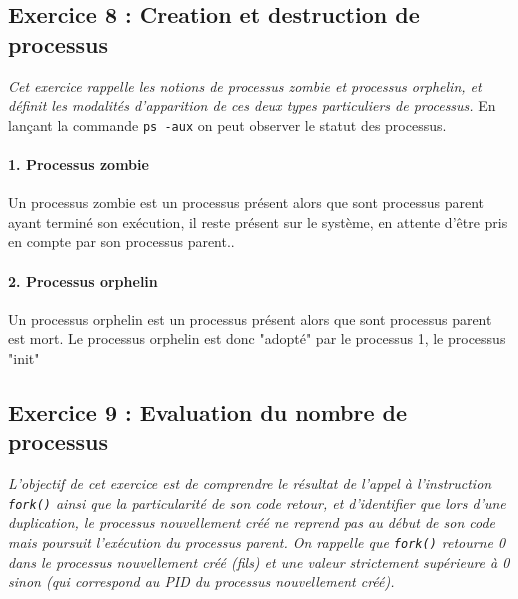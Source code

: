 \subsection{Exercice 8 : Creation et destruction de processus}
\textit{Cet exercice rappelle les notions de processus zombie et processus orphelin, et définit les modalités d’apparition de ces deux types particuliers de processus.}
En lançant la commande \texttt{ps -aux} on peut observer le statut des processus.

\paragraph{1. Processus zombie}
Un processus zombie est un processus présent alors que sont processus parent ayant terminé son exécution, il reste présent sur le système, en attente d'être pris en compte par son processus parent..

\paragraph{2. Processus orphelin}
Un processus orphelin est un processus présent alors que sont processus parent est mort. Le processus orphelin est donc "adopté" par le processus 1, le processus "init"

\subsection{Exercice 9 : Evaluation du nombre de processus}
\textit{L’objectif de cet exercice est de comprendre le résultat de l’appel à l’instruction \texttt{fork()} ainsi que la particularité de son code retour, et d’identifier que lors d’une duplication, le processus nouvellement créé ne reprend pas au début de son code mais poursuit l’exécution du processus parent. On rappelle que \texttt{fork()} retourne 0 dans le processus nouvellement créé (fils) et une valeur strictement supérieure à 0 sinon (qui correspond au PID du processus nouvellement créé).}


